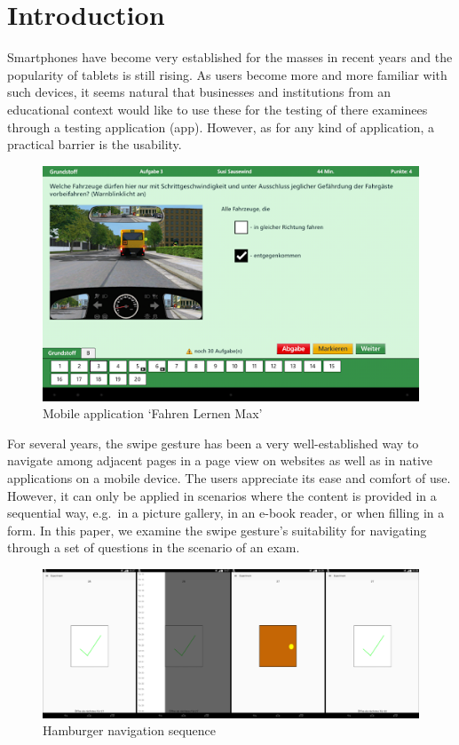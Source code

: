 \documentclass{sig-alternate-05-2015}
\begin{document}
\section{Introduction}
Smartphones have become very established for the masses in recent years and the popularity of tablets is
still rising. As users become more and more familiar with such devices, it seems natural that businesses and institutions
from an educational context would like to use these for the testing of there examinees through a testing application (app).
However, as for any kind of application, a practical barrier is the usability.
\begin{figure}[h]
	\includegraphics[width=\columnwidth]{drivinglicense.png}
	\caption{Mobile application `Fahren Lernen Max'}
	\label{fig:fahren_lernen}
\end{figure}
For several years, the swipe gesture has been a very well-established way to
navigate among adjacent pages in a page view on websites as well as in native applications on a mobile device. The users appreciate its ease and comfort of use. However,
it can only be applied in scenarios where the content is provided in a
sequential way, e.g.\ in a picture gallery, in an e-book reader, or when
filling in a form. In this paper, we examine the swipe gesture's suitability
for navigating through a set of questions in the scenario of an exam.
\begin{figure}[!h]
	\centering
	\includegraphics[width=\linewidth]{pics/screenshots/sequence}
	\caption{Hamburger navigation sequence}
	\label{fig:sequence}
\end{figure}
\end{document}
